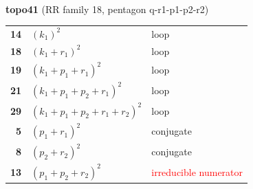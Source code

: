 \documentclass[10pt]{article}
\begin{document}
\begin{minipage}[t]{0.48\textwidth}
{}\\[2mm]\textbf{topo41} (RR family 18, pentagon q-r1-p1-p2-r2)\\[2pt]{\footnotesize\begin{tabular}{@{}r@{\ \ }l@{\ \ }l@{}}\textbf{14} & $(k_1)^2$ & loop\\
\textbf{18} & $(k_1+r_1)^2$ & loop\\
\textbf{19} & $(k_1+p_1+r_1)^2$ & loop\\
\textbf{21} & $(k_1+p_1+p_2+r_1)^2$ & loop\\
\textbf{29} & $(k_1+p_1+p_2+r_1+r_2)^2$ & loop\\
\textbf{5} & $(p_1+r_1)^2$ & conjugate\\
\textbf{8} & $(p_2+r_2)^2$ & conjugate\\
\textbf{13} & $(p_1+p_2+r_2)^2$ & \textcolor{red}{irreducible numerator}\\\end{tabular}}\end{minipage}\hfill%
\end{document}
